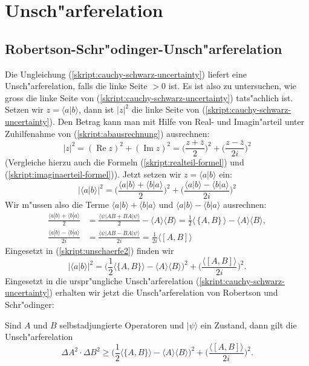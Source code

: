 %
%
\section{Unsch"arferelation}
\subsection{Robertson-Schr"odinger-Unsch"arferelation}
Die Ungleichung (\ref{skript:cauchy-schwarz-uncertainty}) liefert eine
Unsch"arferelation, falls die linke Seite $>0$ ist. Es ist
also zu untersuchen, wie gross die linke Seite von 
(\ref{skript:cauchy-schwarz-uncertainty}) tats"achlich ist.
Setzen wir $z=\langle a|b\rangle$, dann ist $|z|^2$ die linke Seite
von (\ref{skript:cauchy-schwarz-uncertainty}). Den Betrag kann man mit Hilfe
von Real- und Imagin"arteil unter Zuhilfenahme von (\ref{skript:abausrechnung})
ausrechnen:
\[
|z|^2
=
(\operatorname{Re}z)^2+(\operatorname{Im}z)^2
=
\biggl(\frac{z+\bar z}2\biggr)^2 + \biggl(\frac{z-\bar z}{2i}\biggr)^2
\]
(Vergleiche hierzu auch die Formeln (\ref{skript:realteil-formel}) und 
(\ref{skript:imaginaerteil-formel})).
Jetzt setzen wir $z=\langle a|b\rangle$ ein:
\begin{equation}
|\langle a|b\rangle|^2
=
\biggl(\frac{\langle a|b\rangle + \langle b|a\rangle}2\biggr)^2
+
\biggl(\frac{\langle a|b\rangle - \langle b|a\rangle}{2i}\biggr)^2
\label{skript:unschaerfe2}
\end{equation}
Wir m"ussen also die Terme $\langle a|b\rangle + \langle b|a\rangle$
und $\langle a|b\rangle - \langle b|a\rangle$ ausrechnen:
\begin{align*}
\frac{\langle a|b\rangle + \langle b|a\rangle}2
&=
\frac{
\langle\psi|AB+BA|\psi\rangle 
}2
-\langle A\rangle\langle B\rangle
=
\frac12 \langle\,\{A,B\}\,\rangle - \langle A\rangle\langle B\rangle,
\\
\frac{\langle a|b\rangle - \langle b|a\rangle}{2i}
&=
\frac{\langle\psi|AB-BA|\psi\rangle}{2i}
=
\frac1{2i}\langle [A,B]\rangle
\end{align*}
Eingesetzt in (\ref{skript:unschaerfe2}) finden wir
\[
|\langle a|b\rangle|^2
=
\biggl(
\frac12\langle \{A,B\}\rangle - \langle A\rangle\langle B\rangle
\biggr)^2
+
\biggl(
\frac{\langle[A,B]\rangle}{2i}
\biggr)^2.
\]
Eingesetzt in die urspr"ungliche Unsch"arferelation
(\ref{skript:cauchy-schwarz-uncertainty}) erhalten wir jetzt die Unsch"arferelation
von Robertson und Schr"odinger:

\begin{satz}
\label{skript:robertson-schroedinger-unschaerfe}
Sind $A$ und $B$ selbstadjungierte Operatoren und $|\psi\rangle$ ein
Zustand, dann gilt die Unsch"arferelation
\begin{equation}
\Delta A^2\cdot\Delta B^2\ge 
\biggl(
\frac12\langle \{A,B\}\rangle - \langle A\rangle\langle B\rangle
\biggr)^2
+
\biggl(
\frac{\langle[A,B]\rangle}{2i}
\biggr)^2.
\label{skript:uncertainty}
\end{equation}
\end{satz}

